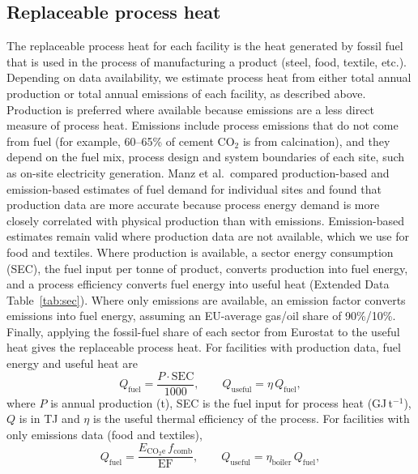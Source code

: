 \documentclass[11pt]{article}
\begin{document}
\subsection*{Replaceable process heat}
The replaceable process heat for each facility is the heat generated by fossil fuel that is used in the process of manufacturing a product (steel, food, textile, etc.). Depending on data availability, we estimate process heat from either total annual production or total annual emissions of each facility, as described above. Production is preferred where available because emissions are a less direct measure of process heat. Emissions include process emissions that do not come from fuel (for example, 60--65\% of cement CO$_2$ is from calcination), and they depend on the fuel mix, process design and system boundaries of each site, such as on-site electricity generation. Manz et al.\ compared production-based and emission-based estimates of fuel demand for individual sites and found that production data are more accurate because process energy demand is more closely correlated with physical production than with emissions\cite{manz2018}. Emission-based estimates remain valid where production data are not available, which we use for food and textiles. Where production is available, a sector energy consumption (SEC)\cite{hotmaps2018}, the fuel input per tonne of product, converts production into fuel energy, and a process efficiency converts fuel energy into useful heat (Extended Data Table~\ref{tab:sec}). Where only emissions are available, an emission factor\cite{ipcc2006stationary} converts emissions into fuel energy, assuming an EU-average gas/oil share of 90\%/10\%\cite{eurostat_nrg_d_indq}. Finally, applying the fossil-fuel share of each sector from Eurostat\cite{eurostat_nrg_d_indq_n} to the useful heat gives the replaceable process heat. For facilities with production data, fuel energy and useful heat are
\begin{equation}
Q_{\mathrm{fuel}} = \frac{P \cdot \mathrm{SEC}}{1000}, \qquad Q_{\mathrm{useful}} = \eta\, Q_{\mathrm{fuel}},
\end{equation}
where $P$ is annual production (t), SEC is the fuel input for process heat (GJ\,t$^{-1}$), $Q$ is in TJ and $\eta$ is the useful thermal efficiency of the process. For facilities with only emissions data (food and textiles),
\begin{equation}
Q_{\mathrm{fuel}} = \frac{E_{\mathrm{CO_2e}}\, f_{\mathrm{comb}}}{\mathrm{EF}}, \qquad Q_{\mathrm{useful}} = \eta_{\mathrm{boiler}}\, Q_{\mathrm{fuel}},
\end{equation}
\end{document}
